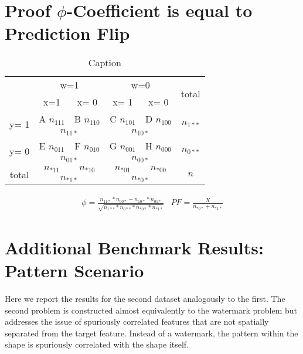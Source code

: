 {\color{gray}
\section{Proof $\phi$-Coefficient is equal to Prediction Flip}
\label{appendix:phi_equals_pf}
\begin{table}[t]
    \centering
\newlength{\width}
\begin{tabular}{|c|c|c|c|c|c|}
    \hline
     \multirow{2}{\width}{}& \multicolumn{2}{|c|}{w=1} &\multicolumn{2}{|c|}{w=0} & \multirow{2}{\width}{total}  \\  \cline{2-5}
     & x=1 & x= 0 & x= 1& x= 0 &\\ \hline
    \multirow{2}{\width}{y= 1} & A $n_{111}$ & B $n_{110}$& C $n_{101}$& D $n_{100}$&\multirow{2}{\width}{$n_{1**}$}    \\ \cline{2-5}
    & \multicolumn{2}{|c|}{$n_{11*}$ }& \multicolumn{2}{|c|}{$n_{10*}$} &  \\ \hline 
    \multirow{2}{\width}{y= 0} & E $n_{011}$& F $n_{010}$& G $n_{001}$& H $n_{000}$& \multirow{2}{\width}{ $n_{0**}$} \\ \cline{2-5}
    & \multicolumn{2}{|c|}{$n_{01*}$} & \multicolumn{2}{|c|}{$n_{00*}$} & \\ \hline 
    \multirow{2}{\width}{total} & $n_{*11}$&  $n_{*10}$&  $n_{*01}$&$n_{*00}$& \multirow{2}{\width}{ $n$ } \\ \cline{2-5}
    & \multicolumn{2}{|c|}{$n_{*1*}$} & \multicolumn{2}{|c|}{$n_{*0*}$} & \\ \hline
\end{tabular}
    \caption{Caption}
    \label{tab:tBLE}
\end{table}
\begin{align*}
\phi = \frac{n_{11*} * n_{00*} - n_{10*}*n_{01*}}{\sqrt{n_{1**}*n_{0**}*n_{*0*}*n_{*1*}}} 
& PF = \frac{X}{n_{*0*}+n_{*1*}}
\end{align*}}

\section{Additional Benchmark Results: Pattern Scenario}\label{appendix:overlap_scenario}
Here we report the results for the second dataset analogously to the first.
The second problem is constructed almost equivalently to the watermark problem but addresses the issue of spuriously correlated features that are not spatially separated from the target feature.
Instead of a watermark, the pattern within the shape is spuriously correlated with the shape itself. 

